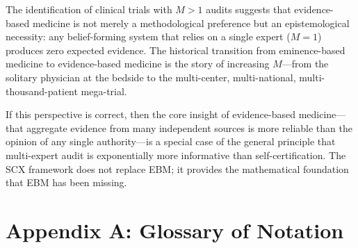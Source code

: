 \documentclass[12pt,a4paper]{article}
\theoremstyle{remark}
\newcommand{\SCX}{\textsf{SCX}}
\begin{document}
The identification of clinical trials with $M>1$ audits suggests that
evidence-based medicine is not merely a methodological preference but an
epistemological necessity: any belief-forming system that relies on a single
expert ($M=1$) produces zero expected evidence. The historical transition
from eminence-based medicine to evidence-based medicine is the story of
increasing $M$---from the solitary physician at the bedside to the
multi-center, multi-national, multi-thousand-patient mega-trial.

If this perspective is correct, then the core insight of evidence-based
medicine---that aggregate evidence from many independent sources is more
reliable than the opinion of any single authority---is a special case of
the general principle that multi-expert audit is exponentially more
informative than self-certification. The \SCX{} framework does not replace
EBM; it provides the mathematical foundation that EBM has been missing.


\section*{Appendix A: Glossary of Notation}
\label{app:notation}
\end{document}
